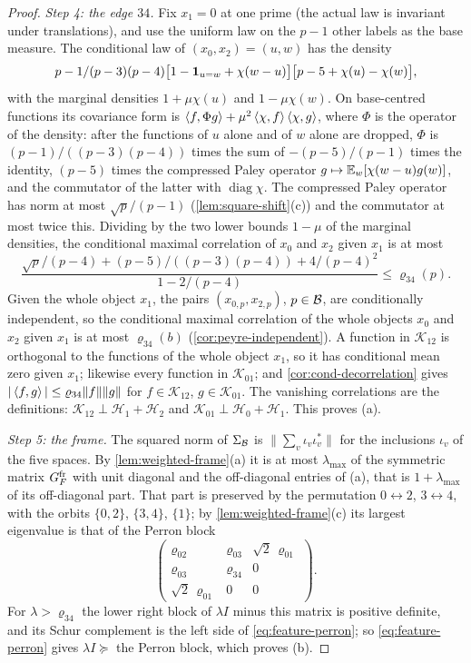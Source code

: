 \begin{proof}
\emph{Step 4: the edge $34$.} Fix $x_1=0$ at one prime (the actual law is
invariant under translations), and use the uniform law on the $p-1$ other labels
as the base measure. The conditional law of $(x_0,x_2)=(u,w)$ has the density
\[
 p-1/(p-3)(p-4)\bigl[1-\mathbf 1_{u=w}+\chi(w-u)\bigr]
 \bigl[p-5+\chi(u)-\chi(w)\bigr],
\]
with the marginal densities $1+\mu\chi(u)$ and $1-\mu\chi(w)$. On base-centred
functions its covariance form is $\left\langle f,\Phi g\right\rangle+\mu^2\left\langle \chi,f\right\rangle\left\langle \chi,g\right\rangle$, where
$\Phi$ is the operator of the density: after the functions of $u$ alone and of $w$
alone are dropped, $\Phi$ is $(p-1)/((p-3)(p-4))$ times the sum of $-(p-5)/(p-1)$
times the identity, $(p-5)$ times the compressed Paley operator
$g\mapsto\mathbb E_w[\chi(w-u)g(w)]$, and the commutator of the latter with
$\operatorname{diag}\chi$. The compressed Paley operator has norm at most
$\sqrt p/(p-1)$ (\cref{lem:square-shift}(c)) and the commutator at most twice this.
Dividing by the two lower bounds $1-\mu$ of the marginal densities, the
conditional maximal correlation of $x_0$ and $x_2$ given $x_1$ is at most
\[
 \frac{\sqrt p/(p-4)+(p-5)/((p-3)(p-4))+4/(p-4)^2}{1-2/(p-4)}\le\varrho_{34}(p).
\]
Given the whole object $x_1$, the pairs $(x_{0,p},x_{2,p})$, $p\in\mathcal B$, are
conditionally independent, so the conditional maximal correlation of the whole
objects $x_0$ and $x_2$ given $x_1$ is at most $\varrho_{34}(b)$
(\cref{cor:peyre-independent}). A function in $\mathcal K_{12}$ is orthogonal to the
functions of the whole object $x_1$, so it has conditional mean zero given $x_1$;
likewise every function in $\mathcal K_{01}$; and \cref{cor:cond-decorrelation} gives
$|\left\langle f,g\right\rangle|\le\varrho_{34}\|f\|\|g\|$ for $f\in\mathcal K_{12}$, $g\in\mathcal K_{01}$. The
vanishing correlations are the definitions: $\mathcal K_{12}\perp\mathcal H_1+\mathcal H_2$
and $\mathcal K_{01}\perp\mathcal H_0+\mathcal H_1$. This proves (a).

\emph{Step 5: the frame.} The squared norm of $\Sigma_\mathcal B$ is
$\|\sum_v\iota_v\iota_v^*\|$ for the inclusions $\iota_v$ of the five spaces. By
\cref{lem:weighted-frame}(a) it is at most $\lambda_{\max}$ of the symmetric
matrix $G^{\rm fr}_F$ with unit diagonal and the off-diagonal entries of (a), that is
$1+\lambda_{\max}$ of its off-diagonal part. That part is preserved by the
permutation $0\leftrightarrow2$, $3\leftrightarrow4$, with the orbits $\{0,2\}$,
$\{3,4\}$, $\{1\}$; by \cref{lem:weighted-frame}(c) its largest eigenvalue is that of
the Perron block
\[
 \begin{pmatrix}\varrho_{02}&\varrho_{03}&\sqrt2\,\varrho_{01}\\
 \varrho_{03}&\varrho_{34}&0\\ \sqrt2\,\varrho_{01}&0&0\end{pmatrix}.
\]
For $\lambda>\varrho_{34}$ the lower right block of $\lambda I$ minus this matrix is
positive definite, and its Schur complement is the left side of
\eqref{eq:feature-perron}; so \eqref{eq:feature-perron} gives $\lambda I\succeq$ the
Perron block, which proves (b).


\end{proof}
